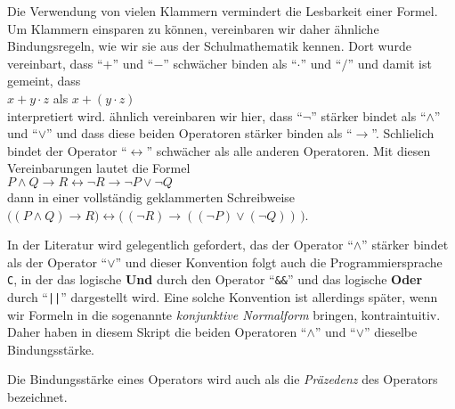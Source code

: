\begin{enumerate}
      Die Verwendung von vielen Klammern vermindert die Lesbarkeit einer Formel.  Um
      Klammern einsparen zu k\"{o}nnen, vereinbaren wir daher \"{a}hnliche Bindungsregeln, wie wir
      sie aus der Schulmathematik kennen.  Dort wurde vereinbart, dass ``$+$'' und ``$-$'' schw\"{a}cher
      binden als  ``$\cdot $'' und ``$/$'' und damit ist gemeint, dass \\[0.2cm]
      \hspace*{1.3cm} $x + y \cdot z$  \quad als \quad $x + (y \cdot z)$ \\[0.2cm]
      interpretiert wird.  \"{a}hnlich vereinbaren wir hier, dass ``$\neg$'' st\"{a}rker bindet als ``$\wedge$''
      und ``$\vee$'' und dass diese beiden Operatoren st\"{a}rker binden als
      ``$\rightarrow$''.  Schlie\3lich bindet der Operator ``$\leftrightarrow$'' 
      schw\"{a}cher als alle anderen Operatoren.  Mit diesen Vereinbarungen lautet die Formel \\[0.2cm]
      \hspace*{1.3cm} $P \wedge Q \rightarrow R \leftrightarrow \neg R \rightarrow \neg P \vee \neg Q$ \\[0.2cm]
      dann in einer vollst\"{a}ndig geklammerten Schreibweise \\[0.2cm]
      \hspace*{1.3cm}  
      $\bigl((P \wedge Q) \rightarrow R\bigr) \leftrightarrow \bigl(\,(\neg R) \rightarrow ((\neg P) \vee (\neg Q))\,\bigr)$. 
      
      \remark
      In der Literatur wird gelegentlich gefordert, das der Operator ``$\wedge$'' st\"{a}rker
      bindet als der Operator ``$\vee$'' und dieser Konvention folgt auch die
      Programmiersprache \texttt{C}, in der das logische \textbf{Und} durch den Operator
      ``\texttt{\&\&}'' und das logische \textbf{Oder} durch ``\texttt{||}'' dargestellt wird.
      Eine solche Konvention ist allerdings sp\"{a}ter, wenn wir Formeln in die sogenannte
      \emph{konjunktive Normalform} bringen, kontraintuitiv.  Daher haben in diesem Skript
      die beiden Operatoren ``$\wedge$'' und ``$\vee$'' dieselbe Bindungsst\"{a}rke.
      
      \remark
      Die Bindungsst\"{a}rke eines Operators wird auch als die \emph{Pr\"{a}zedenz} des Operators bezeichnet.


\end{enumerate}
